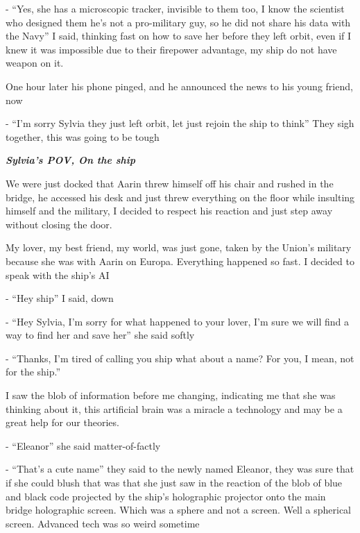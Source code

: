 \documentclass[colorlinks,12pt,a4paper]{book}
\begin{document}
 - “Yes, she has a microscopic tracker, invisible to them too, I know the scientist who designed them he's not a pro-military
  guy, so he did not share his data with the Navy” I said, thinking fast on how to save her before they left orbit, even if
   I knew it was impossible due to their firepower advantage, my ship do not have weapon on it.\par
   \bigskip
 
 One hour later his phone pinged, and he announced the news to his young friend, now\par
 \bigskip
 - “I'm sorry Sylvia they just left orbit, let just rejoin the ship to think” They sigh together, this was going to be 
 tough\par
 \bigskip
 
 \textit{\textbf{Sylvia's POV, On the ship}}\par
 \bigskip
 
 We were just docked that Aarin threw himself off his chair and rushed in the bridge, he accessed his desk and just threw 
 everything on the floor while insulting himself and the military, I decided to respect his reaction and just step away 
 without closing the door.\par
 \bigskip
 
 My lover, my best friend, my world, was just gone, taken by the Union's military because she was with Aarin on Europa. 
 Everything happened so fast. I decided to speak with the ship's AI\par
 \bigskip
 
 - “Hey ship” I said, down\par
 \bigskip
 - “Hey Sylvia, I'm sorry for what happened to your lover, I'm sure we will find a way to find her and save her” she said 
 softly\par
 \bigskip
 - “Thanks, I'm tired of calling you ship what about a name? For you, I mean, not for the ship.”\par
 \bigskip
 
 I saw the blob of information before me changing, indicating me that she was thinking about it, this artificial
  brain was a miracle a technology and may be a great help for our theories.\par
  \bigskip
 
 - “Eleanor” she said matter-of-factly\par
 \bigskip
 - “That's a cute name” they said to the newly named Eleanor, they was sure that if she could blush that was that 
 she just saw in the reaction of the blob of blue and black code projected by the ship's holographic projector onto the 
 main bridge holographic screen. Which was a sphere and not a screen. Well a spherical screen. Advanced tech was so weird 
 sometime\par
 \bigskip
 
\end{document}
